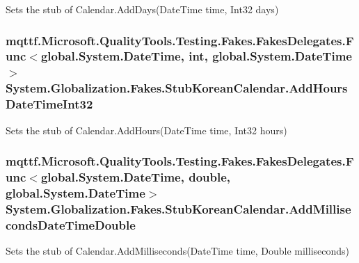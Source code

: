 Sets the stub of Calendar.\-Add\-Days(\-Date\-Time time, Int32 days)

\hypertarget{class_system_1_1_globalization_1_1_fakes_1_1_stub_korean_calendar_a3fb28f1c3f7d02477d0fc10d145dc43e}{
\subsubsection[{Add\-Hours\-Date\-Time\-Int32}]{\setlength{\rightskip}{0pt plus 5cm}mqttf.\-Microsoft.\-Quality\-Tools.\-Testing.\-Fakes.\-Fakes\-Delegates.\-Func$<$global.\-System.\-Date\-Time, int, global.\-System.\-Date\-Time$>$ System.\-Globalization.\-Fakes.\-Stub\-Korean\-Calendar.\-Add\-Hours\-Date\-Time\-Int32}}\label{class_system_1_1_globalization_1_1_fakes_1_1_stub_korean_calendar_a3fb28f1c3f7d02477d0fc10d145dc43e}


Sets the stub of Calendar.\-Add\-Hours(\-Date\-Time time, Int32 hours)

\hypertarget{class_system_1_1_globalization_1_1_fakes_1_1_stub_korean_calendar_a07341a6860d01843c67754e83421cba7}{
\subsubsection[{Add\-Milliseconds\-Date\-Time\-Double}]{\setlength{\rightskip}{0pt plus 5cm}mqttf.\-Microsoft.\-Quality\-Tools.\-Testing.\-Fakes.\-Fakes\-Delegates.\-Func$<$global.\-System.\-Date\-Time, double, global.\-System.\-Date\-Time$>$ System.\-Globalization.\-Fakes.\-Stub\-Korean\-Calendar.\-Add\-Milliseconds\-Date\-Time\-Double}}\label{class_system_1_1_globalization_1_1_fakes_1_1_stub_korean_calendar_a07341a6860d01843c67754e83421cba7}


Sets the stub of Calendar.\-Add\-Milliseconds(\-Date\-Time time, Double milliseconds)

